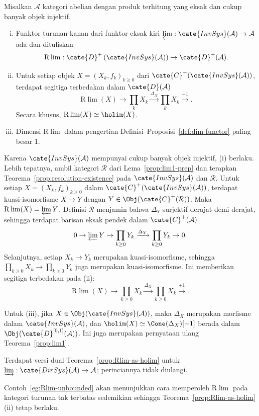 \begin{teorema}\label{prop:Rlim-as-holim}
	Misalkan $\mathcal{A}$ kategori abelian dengan produk terhitung yang eksak
	dan cukup banyak objek injektif.
	\begin{enumerate}[(i)]
		\item Funktor turunan kanan dari funktor eksak kiri
		$\varprojlim:\cate{InvSys}(\mathcal{A})\to\mathcal{A}$ ada dan dituliskan
		\[ \mathrm{R}\lim :  \cate{D}^+\left(\cate{InvSys}(\mathcal{A})\right) \to \cate{D}^+(\mathcal{A}) . \]
		\item Untuk setiap objek $X=(X_k,f_k)_{k\geq0}$ dari
		$\cate{C}^+(\cate{InvSys}(\mathcal{A}))$, terdapat segitiga terbedakan
		dalam $\cate{D}(\mathcal{A})$
		\[ \mathrm{R}\lim(X) \to \prod_k X_k \xrightarrow{\Delta_X} \prod_k X_k \xrightarrow{+1}. \]
		Secara khusus, $\mathrm{R}\lim(X)\simeq\holim(X)$.
		\item Dimensi $\mathrm{R}\lim$ dalam pengertian
		Definisi--Proposisi~\ref{def:dim-functor} paling besar $1$.
	\end{enumerate}
\end{teorema}
\begin{bukti}
	Karena $\cate{InvSys}(\mathcal{A})$ mempunyai cukup banyak objek injektif,
	(i) berlaku. Lebih tepatnya, ambil kategori $\mathcal{R}$ dari
	Lema~\ref{prop:lim1-prep} dan terapkan
	Teorema~\ref{prop:resolution-existence} pada
	$\cate{InvSys}(\mathcal{A})$ dan $\mathcal{R}$. Untuk setiap
	$X=(X_k,f_k)_{k\geq0}$ dalam
	$\cate{C}^+(\cate{InvSys}(\mathcal{A}))$, terdapat kuasi-isomorfisme
	$X\to Y$ dengan $Y\in\Obj(\cate{C}^+(\mathcal{R}))$. Maka
	$\mathrm{R}\lim(X)=\varprojlim Y$. Definisi $\mathcal{R}$ menjamin bahwa
	$\Delta_Y$ surjektif derajat demi derajat, sehingga terdapat barisan eksak
	pendek dalam $\cate{C}^+(\mathcal{A})$
	\[ 0 \to \varprojlim Y \to \prod_{k \geq 0} Y_k \xrightarrow{\Delta_Y} \prod_{k \geq 0} Y_k \to 0. \]
	Selanjutnya, setiap $X_k\to Y_k$ merupakan kuasi-isomorfisme, sehingga
	$\prod_{k\geq0}X_k\to\prod_{k\geq0}Y_k$ juga merupakan kuasi-isomorfisme.
	Ini memberikan segitiga terbedakan pada (ii):
	\[ \mathrm{R}\lim(X) \to \prod_{k \geq 0} X_k \xrightarrow{\Delta_X} \prod_{k \geq 0} X_k \xrightarrow{+1} . \]

	Untuk (iii), jika $X\in\Obj(\cate{InvSys}(\mathcal{A}))$, maka $\Delta_X$
	merupakan morfisme dalam $\cate{InvSys}(\mathcal{A})$, dan
	$\holim(X)\simeq\Cone(\Delta_X)[-1]$ berada dalam
	$\Obj(\cate{D}^{[0,1]}(\mathcal{A}))$. Ini juga merupakan pernyataan ulang
	Teorema~\ref{prop:lim1}.
\end{bukti}

Terdapat versi dual Teorema~\ref{prop:Rlim-as-holim} untuk
$\varinjlim:\cate{DirSys}(\mathcal{A})\to\mathcal{A}$; perinciannya tidak
diulangi.

Contoh~\ref{eg:Rlim-unbounded} akan menunjukkan cara memperoleh
$\mathrm{R}\lim$ pada kategori turunan tak terbatas sedemikian sehingga
Teorema~\ref{prop:Rlim-as-holim} (ii) tetap berlaku.
